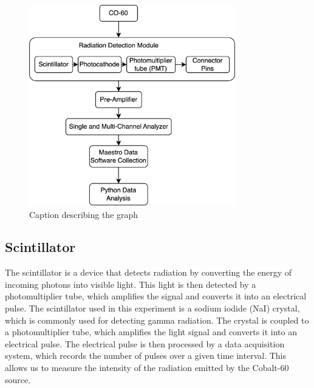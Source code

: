 \documentclass[12pt]{article}
\begin{document}
            \begin{figure}[h!]
                \centering
                \includegraphics[width=0.8\textwidth]{./img/other/Lab1 Apparatus.png}
                \caption{Caption describing the graph}
                \label{fig:graph2}
            \end{figure}


        \subsection{Scintillator}
            The scintillator is a device that detects radiation by converting the energy of incoming photons into visible light. 
            This light is then detected by a photomultiplier tube, which amplifies the signal and converts it into an electrical pulse. 
            The scintillator used in this experiment is a sodium iodide (NaI) crystal, which is commonly used for detecting gamma radiation. 
            The crystal is coupled to a photomultiplier tube, which amplifies the light signal and converts it into an electrical pulse. 
            The electrical pulse is then processed by a data acquisition system, which records the number of pulses over a given time interval. 
            This allows us to measure the intensity of the radiation emitted by the Cobalt-60 source.
\end{document}
